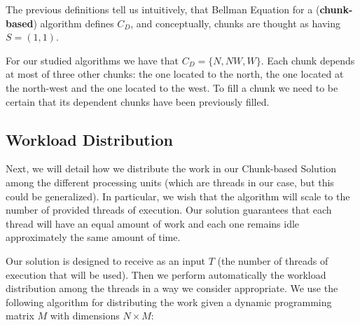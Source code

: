 \documentclass[journal]{IEEEtran}
\begin{document}
The previous definitions tell us intuitively, that Bellman Equation for a (\textbf{chunk-based}) algorithm defines $C_D$, and conceptually, chunks are thought as having $S = (1, 1)$.

For our studied algorithms we have that $C_D = \{N, NW, W\}$. Each chunk depends at most of three other chunks: the one located to the north, the one located at the north-west and the one located to the west. To fill a chunk we need to be certain that its dependent chunks have been previously filled.

\subsection{Workload Distribution}

Next, we will detail how we distribute the work in our Chunk-based Solution among the different processing units (which are threads in our case, but this could be generalized). In particular, we wish that the algorithm will scale to the number of provided threads of execution. Our solution guarantees that each thread will have an equal amount of work and each one remains idle approximately the same amount of time.

Our solution is designed to receive as an input $T$ (the number of threads of execution that will be used). Then we perform automatically the workload distribution among the threads in a way we consider appropriate. We use the following algorithm for distributing the work given a dynamic programming matrix $M$ with dimensions $N \times M$:
\end{document}
